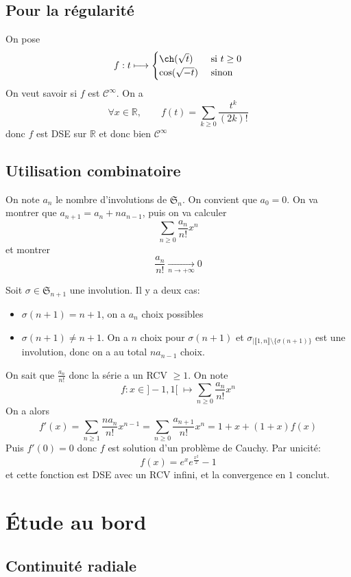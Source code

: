 \subsection{Pour la régularité}

On pose \[
    f:t\longmapsto \begin{cases}
        \ch(\sqrt t) &\text{ si }t\geq 0 \\
        \cos(\sqrt{-t}) &\text{ sinon }
    \end{cases}
\]
On veut savoir si $f$ est $\mathcal C^\infty$. On a \[
    \forall x\in\mathbb R, \qquad f(t)=\sum_{k\geq 0}\frac{t^k}{(2k)!}
\]
donc $f$ est DSE sur $\mathbb R$ et donc bien $\mathcal C^\infty$

\subsection{Utilisation combinatoire}

On note $a_n$ le nombre d'involutions de $\mathfrak S_n$. On convient que $a_0=0$. On va montrer que $a_{n+1}=a_n+na_{n-1}$, puis on va calculer \[
    \sum_{n\geq 0}\frac{a_n}{n!}x^n
\]
et montrer \[
    \frac{a_n}{n!}\xrightarrow[n\to+\infty]{}0
\]

Soit $\sigma\in\mathfrak S_{n+1}$ une involution. Il y a deux cas: \begin{itemize}
    \item $\sigma(n+1)=n+1$, on a $a_n$ choix possibles
    \item $\sigma(n+1)\neq n+1$. On a $n$ choix pour $\sigma(n+1)$ et $\sigma_{|\llbracket 1, n\rrbracket \setminus\{\sigma(n+1)\}}$ est une involution, donc on a au total $na_{n-1}$ choix.
\end{itemize}

On sait que $\frac{a_n}{n!}$ donc la série a un RCV $\geq 1$. On note \[
    f:x\in ]-1, 1[\;\longmapsto \sum_{n\geq 0}\frac{a_n}{n!}x^n
\]
On a alors \[
    f'(x)=\sum_{n\geq 1}\frac{na_n}{n!}x^{n-1}=\sum_{n\geq 0}\frac{a_{n+1}}{n!}x^n=1+x+(1+x)f(x)
\]
Puis $f'(0)=0$ donc $f$ est solution d'un problème de Cauchy. Par unicité: \[
    f(x)=e^xe^{\frac {x^2}2}-1
\]
et cette fonction est DSE avec un RCV infini, et la convergence en $1$ conclut.

\section{Étude au bord}

\subsection{Continuité radiale}

